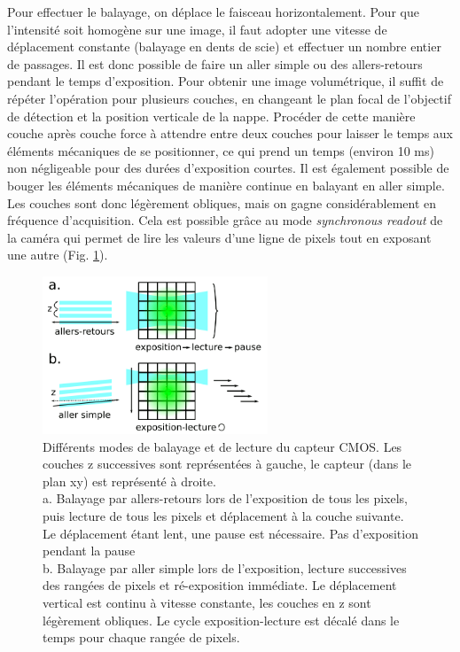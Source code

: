 Pour effectuer le balayage, on déplace le faisceau horizontalement. Pour que l'intensité soit homogène sur une image, il faut adopter une vitesse de déplacement constante (balayage en dents de scie) et effectuer un nombre entier de passages. Il est donc possible de faire un aller simple ou des allers-retours pendant le temps d'exposition. Pour obtenir une image volumétrique, il suffit de répéter l'opération pour plusieurs couches, en changeant le plan focal de l'objectif de détection et la position verticale de la nappe. Procéder de cette manière couche après couche force à attendre entre deux couches pour laisser le temps aux éléments mécaniques de se positionner, ce qui prend un temps (environ 10 ms) non négligeable pour des durées d'exposition courtes. Il est également possible de bouger les éléments mécaniques de manière continue en balayant en aller simple. Les couches sont donc légèrement obliques, mais on gagne considérablement en fréquence d'acquisition. Cela est possible grâce au mode \emph{synchronous readout} de la caméra qui permet de lire les valeurs d'une ligne de pixels tout en exposant une autre (Fig. \ref{FIGsynchronousreadout}).


\begin{figure}
    \centering
    \includegraphics[width=0.6\textwidth]{./files/schema_balayage.svg.png}
    \caption{Différents modes de balayage et de lecture du capteur CMOS. Les couches z successives sont représentées à gauche, le capteur (dans le plan xy) est représenté à droite.\\
    a. Balayage par allers-retours lors de l'exposition de tous les pixels, puis lecture de tous les pixels et déplacement à la couche suivante. Le déplacement étant lent, une pause est nécessaire. Pas d'exposition pendant la pause\\
    b. Balayage par aller simple lors de l'exposition, lecture successives des rangées de pixels et ré-exposition immédiate. Le déplacement vertical est continu à vitesse constante, les couches en z sont légèrement obliques. Le cycle exposition-lecture est décalé dans le temps pour chaque rangée de pixels.
    \label{FIGsynchronousreadout}}
    \end{figure}

